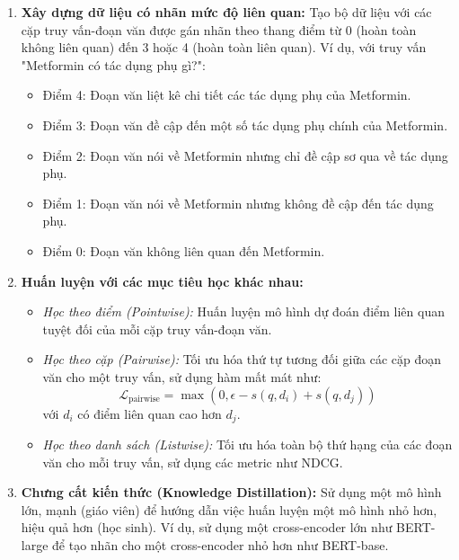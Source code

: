 \begin{enumerate}
    \item \textbf{Xây dựng dữ liệu có nhãn mức độ liên quan:} Tạo bộ dữ liệu với các cặp truy vấn-đoạn văn được gán nhãn theo thang điểm từ 0 (hoàn toàn không liên quan) đến 3 hoặc 4 (hoàn toàn liên quan). Ví dụ, với truy vấn "Metformin có tác dụng phụ gì?":
    \begin{itemize}
        \item Điểm 4: Đoạn văn liệt kê chi tiết các tác dụng phụ của Metformin.
        \item Điểm 3: Đoạn văn đề cập đến một số tác dụng phụ chính của Metformin.
        \item Điểm 2: Đoạn văn nói về Metformin nhưng chỉ đề cập sơ qua về tác dụng phụ.
        \item Điểm 1: Đoạn văn nói về Metformin nhưng không đề cập đến tác dụng phụ.
        \item Điểm 0: Đoạn văn không liên quan đến Metformin.
    \end{itemize}
    
    \item \textbf{Huấn luyện với các mục tiêu học khác nhau:}
    \begin{itemize}
        \item \textit{Học theo điểm (Pointwise):} Huấn luyện mô hình dự đoán điểm liên quan tuyệt đối của mỗi cặp truy vấn-đoạn văn.
        \item \textit{Học theo cặp (Pairwise):} Tối ưu hóa thứ tự tương đối giữa các cặp đoạn văn cho một truy vấn, sử dụng hàm mất mát như:
        \begin{equation}
        \mathcal{L}_{\text{pairwise}} = \max(0, \epsilon - s(q, d_i) + s(q, d_j))
        \end{equation}
        với $d_i$ có điểm liên quan cao hơn $d_j$.
        \item \textit{Học theo danh sách (Listwise):} Tối ưu hóa toàn bộ thứ hạng của các đoạn văn cho mỗi truy vấn, sử dụng các metric như NDCG.
    \end{itemize}
    
    \item \textbf{Chưng cất kiến thức (Knowledge Distillation):} Sử dụng một mô hình lớn, mạnh (giáo viên) để hướng dẫn việc huấn luyện một mô hình nhỏ hơn, hiệu quả hơn (học sinh). Ví dụ, sử dụng một cross-encoder lớn như BERT-large để tạo nhãn cho một cross-encoder nhỏ hơn như BERT-base.
\end{enumerate}

